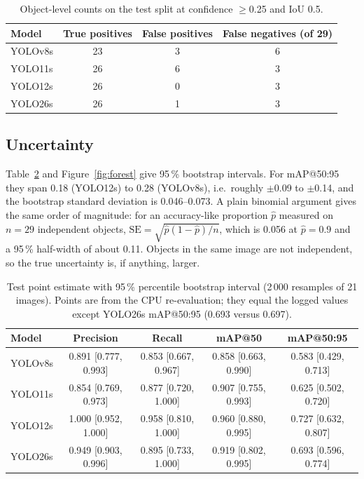 \documentclass[11pt,a4paper]{article}
\begin{document}
\begin{table}[H]
\centering\small
\begin{tabular}{lccc}
\toprule
Model & True positives & False positives & False negatives (of 29)\\
\midrule
YOLOv8s & 23 & 3 & 6\\
YOLO11s & 26 & 6 & 3\\
YOLO12s & 26 & 0 & 3\\
YOLO26s & 26 & 1 & 3\\
\bottomrule
\end{tabular}
\caption{Object-level counts on the test split at confidence $\ge$0.25 and IoU 0.5.}
\label{tab:counts}
\end{table}

\subsection{Uncertainty}\label{sec:uncertainty}
Table~\ref{tab:ci} and Figure~\ref{fig:forest} give 95\,\% bootstrap intervals. For mAP@50:95 they span 0.18 (YOLO12s) to 0.28 (YOLOv8s), i.e.\ roughly $\pm$0.09 to $\pm$0.14, and the bootstrap standard deviation is 0.046--0.073. A plain binomial argument gives the same order of magnitude: for an accuracy-like proportion $\hat p$ measured on $n=29$ independent objects, $\mathrm{SE}=\sqrt{\hat p(1-\hat p)/n}$, which is 0.056 at $\hat p=0.9$ and a 95\,\% half-width of about 0.11. Objects in the same image are not independent, so the true uncertainty is, if anything, larger.

\begin{table}[H]
\centering\small
\begin{tabular}{lcccc}
\toprule
Model & Precision & Recall & mAP@50 & mAP@50:95\\
\midrule
YOLOv8s & 0.891 [0.777, 0.993] & 0.853 [0.667, 0.967] & 0.858 [0.663, 0.990] & 0.583 [0.429, 0.713]\\
YOLO11s & 0.854 [0.769, 0.973] & 0.877 [0.720, 1.000] & 0.907 [0.755, 0.993] & 0.625 [0.502, 0.720]\\
YOLO12s & 1.000 [0.952, 1.000] & 0.958 [0.810, 1.000] & 0.960 [0.880, 0.995] & 0.727 [0.632, 0.807]\\
YOLO26s & 0.949 [0.903, 0.996] & 0.895 [0.733, 1.000] & 0.919 [0.802, 0.995] & 0.693 [0.596, 0.774]\\
\bottomrule
\end{tabular}
\caption{Test point estimate with 95\,\% percentile bootstrap interval (2\,000 resamples of 21 images). Points are from the CPU re-evaluation; they equal the logged values except YOLO26s mAP@50:95 (0.693 versus 0.697).}
\label{tab:ci}
\end{table}
\end{document}

